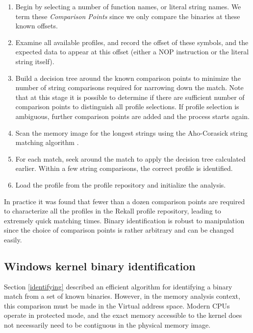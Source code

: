 \begin{enumerate}
\item Begin by selecting a number of function names, or literal string names. We
  term these {\em Comparison Points} since we only compare the binaries at these
  known offsets.

\item Examine all available profiles, and record the offset of these symbols,
  and the expected data to appear at this offset (either a NOP instruction or
  the literal string itself).

\item Build a decision tree around the known comparison points to minimize the
  number of string comparisons required for narrowing down the match. Note that
  at this stage it is possible to determine if there are sufficient number of
  comparison points to distinguish all profile selections. If profile selection
  is ambiguous, further comparison points are added and the process starts
  again.

\item Scan the memory image for the longest strings using the Aho-Corasick
  string matching algorithm \citep{aho1975efficient}.

\item For each match, seek around the match to apply the decision tree
  calculated earlier. Within a few string comparisons, the correct profile is
  identified.

\item Load the profile from the profile repository and initialize the analysis.
\end{enumerate}

In practice it was found that fewer than a dozen comparison points are required
to characterize all the profiles in the Rekall profile repository, leading to
extremely quick matching times. Binary identification is robust to manipulation
since the choice of comparison points is rather arbitrary and can be changed
easily.

\subsection{Windows kernel binary identification}
Section \ref{identifying} described an efficient algorithm for identifying a
binary match from a set of known binaries. However, in the memory analysis
context, this comparison must be made in the Virtual address space. Modern CPUs
operate in protected mode, and the exact memory accessible to the kernel does
not necessarily need to be contiguous in the physical memory image.

